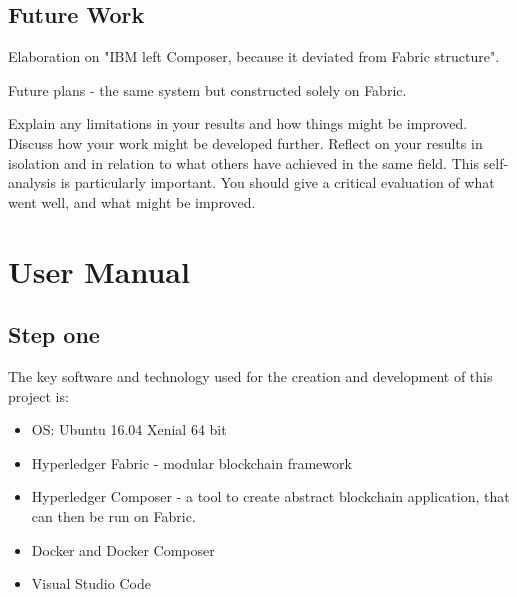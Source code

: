 \documentclass[a4paper,11pt]{report}
\begin{document}
\section{Future Work}

\label{conclusion-future}

Elaboration on "IBM left Composer, because it deviated from Fabric structure".

Future plans - the same system but constructed solely on Fabric.	


Explain any limitations in your results and how things might be improved.
Discuss how your work might be developed further. Reflect on your results in
isolation and in relation to what others have achieved in the same field. This
self-analysis is particularly important. You should give a critical evaluation
of what went well, and what might be improved.







\appendix

\chapter{User Manual}
\label{usermanual}


\section{Step one}
\label{stepOne}
	 
The key software and technology used for the creation and development of this project is:
\begin{itemize}
\item OS: Ubuntu 16.04 Xenial 64 bit
\item Hyperledger Fabric - modular blockchain framework
\item Hyperledger Composer - a tool to create abstract blockchain application, that can then be run on Fabric.
\item Docker and Docker Composer
\item Visual Studio Code
\end{itemize}
\end{document}
